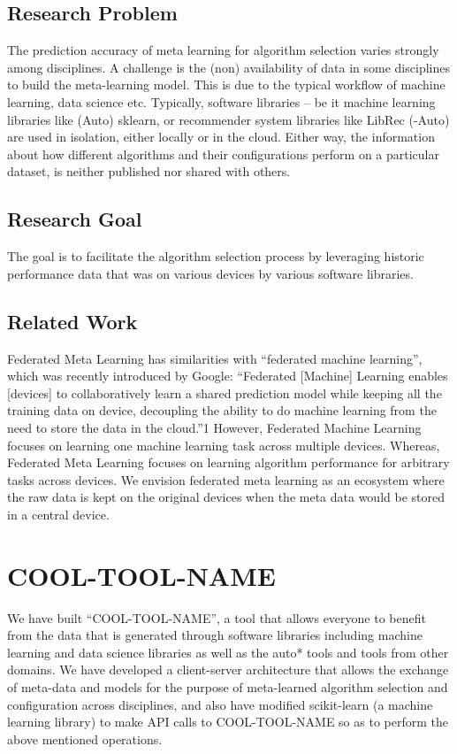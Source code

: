 \documentclass{article}
\begin{document}
\subsection{Research Problem}
The prediction accuracy of meta learning for algorithm selection varies strongly among disciplines. A challenge is the (non) availability of data in some disciplines to build the meta-learning model. This is due to the typical workflow of machine learning, data science etc. Typically, software libraries – be it machine learning libraries like (Auto) sklearn, or recommender system libraries like LibRec (-Auto) are used in isolation, either locally or in the cloud. Either way, the information about how different algorithms and their configurations perform on a particular dataset, is neither published nor shared with others.

\subsection{Research Goal}
The goal is to facilitate the algorithm selection process by leveraging historic performance data that was on various devices by various software libraries.

\subsection{Related Work}
Federated Meta Learning has similarities with “federated machine learning”, which was recently introduced by Google: “Federated [Machine] Learning enables [devices] to collaboratively learn a shared prediction model while keeping all the training data on device, decoupling the ability to do machine learning from the need to store the data in the cloud.”1 However, Federated Machine Learning focuses on learning one machine learning task across multiple devices. Whereas, Federated Meta Learning focuses on learning algorithm performance for arbitrary tasks across devices. We envision federated meta learning as an ecosystem where the raw data is kept on the original devices when the meta data would be stored in a central device. 


\section{COOL-TOOL-NAME}
We have built “COOL-TOOL-NAME”, a tool that allows everyone to benefit from the data that is generated through software libraries including machine learning and data science libraries as well as the auto* tools and tools from other domains. We have developed a client-server architecture that allows the exchange of meta-data and models for the purpose of meta-learned algorithm selection and configuration across disciplines, and also have modified scikit-learn (a machine learning library) to make API calls to COOL-TOOL-NAME so as to perform the above mentioned operations.
\end{document}
